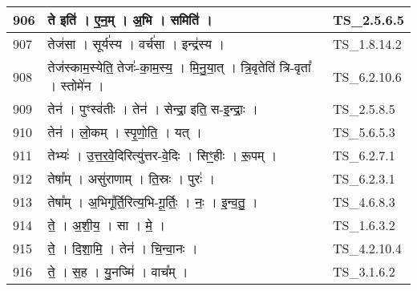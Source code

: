\documentclass[17pt]{extarticle}
\begin{document}
\begin{longtable}{||p{0.4in}||p{4.9in}||p{0.9in}||}
    \hline
        
    906 & ते इति॑   ।   ए॒न॒म्   ।   अ॒भि   ।   समिति॑   ।    & TS\_2.5.6.5       \\
    
    \hline
        
    907 & तेज॑सा   ।   सूर्य॑स्य   ।   वर्च॑सा   ।   इन्द्र॑स्य   ।    & TS\_1.8.14.2       \\
    
    \hline
        
    908 & तेज॑स्काम॒स्येति॒ तेजः॑{-}का॒म॒स्य॒   ।   मि॒नु॒या॒त्   ।   त्रि॒वृतेति॑ त्रि{-}वृता᳚   ।   स्तोमे॑न   ।    & TS\_6.2.10.6       \\
    
    \hline
        
    909 & तेन॑   ।   पुꣳस्व॑तीः   ।   तेन॑   ।   सेन्द्रा॒ इति॒ स{-}इ॒न्द्राः॒   ।    & TS\_2.5.8.5       \\
    
    \hline
        
    910 & तेन॑   ।   लो॒कम्   ।   स्पृ॒णो॒ति॒   ।   यत्   ।    & TS\_5.6.5.3       \\
    
    \hline
        
    911 & तेभ्यः॑   ।   उ॒त्त॒र॒वे॒दिरित्यु॑त्तर{-}वे॒दिः   ।   सिꣳ॒॒हीः   ।   रू॒पम्   ।    & TS\_6.2.7.1       \\
    
    \hline
        
    912 & तेषा᳚म्   ।   असु॑राणाम्   ।   ति॒स्रः   ।   पुरः॑   ।    & TS\_6.2.3.1       \\
    
    \hline
        
    913 & तेषा᳚म्   ।   अ॒भिगू᳚र्ति॒रित्य॒भि{-}गू॒र्तिः॒   ।   नः॒   ।   इ॒न्व॒तु॒   ।    & TS\_4.6.8.3       \\
    
    \hline
        
    914 & ते॒   ।   अ॒शी॒य॒   ।   सा   ।   मे॒   ।    & TS\_1.6.3.2       \\
    
    \hline
        
    915 & ते॒   ।   दि॒शा॒मि॒   ।   तेन॑   ।   चि॒न्वा॒नः   ।    & TS\_4.2.10.4       \\
    
    \hline
        
    916 & ते॒   ।   स॒ह   ।   यु॒नज्मि॑   ।   वाच᳚म्   ।    & TS\_3.1.6.2       \\
    

\end{longtable}
\end{document}
